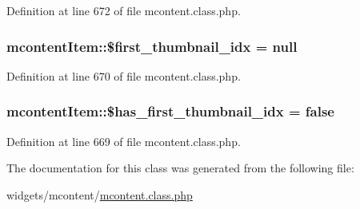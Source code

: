 Definition at line 672 of file mcontent.\-class.\-php.

\hypertarget{classmcontentItem_a358e826e3ee863300d43b12a8218a5fa}{
\subsubsection[{\$first\-\_\-thumbnail\-\_\-idx}]{\setlength{\rightskip}{0pt plus 5cm}mcontent\-Item\-::\$first\-\_\-thumbnail\-\_\-idx = null}}\label{classmcontentItem_a358e826e3ee863300d43b12a8218a5fa}


Definition at line 670 of file mcontent.\-class.\-php.

\hypertarget{classmcontentItem_a8c95afa6c7bcad64626c9f343e77cdd4}{
\subsubsection[{\$has\-\_\-first\-\_\-thumbnail\-\_\-idx}]{\setlength{\rightskip}{0pt plus 5cm}mcontent\-Item\-::\$has\-\_\-first\-\_\-thumbnail\-\_\-idx = false}}\label{classmcontentItem_a8c95afa6c7bcad64626c9f343e77cdd4}


Definition at line 669 of file mcontent.\-class.\-php.



The documentation for this class was generated from the following file\-:\begin{DoxyCompactItemize}
\item 
widgets/mcontent/\hyperlink{mcontent_8class_8php}{mcontent.\-class.\-php}\end{DoxyCompactItemize}
